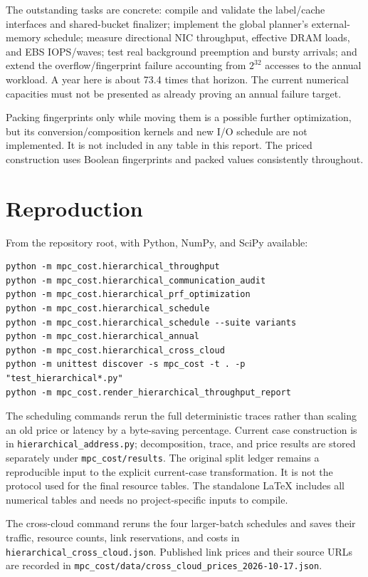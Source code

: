 \documentclass[11pt]{article}
\begin{document}
The outstanding tasks are concrete: compile and validate the label/cache
interfaces and shared-bucket finalizer; implement the global planner's
external-memory schedule; measure directional NIC throughput, effective
DRAM loads, and EBS IOPS/waves; test real background preemption and bursty
arrivals; and extend the overflow/fingerprint failure accounting from
$2^{32}$ accesses to the annual workload. A year here is about 73.4 times
that horizon. The current numerical capacities must not be presented as
already proving an annual failure target.

Packing fingerprints only while moving them is a possible further
optimization, but its conversion/composition kernels and new I/O schedule
are not implemented. It is not included in any table in this report.
The priced construction uses Boolean fingerprints and packed values
consistently throughout.

\appendix
\section{Reproduction}
From the repository root, with Python, NumPy, and SciPy available:
\begin{verbatim}
python -m mpc_cost.hierarchical_throughput
python -m mpc_cost.hierarchical_communication_audit
python -m mpc_cost.hierarchical_prf_optimization
python -m mpc_cost.hierarchical_schedule
python -m mpc_cost.hierarchical_schedule --suite variants
python -m mpc_cost.hierarchical_annual
python -m mpc_cost.hierarchical_cross_cloud
python -m unittest discover -s mpc_cost -t . -p "test_hierarchical*.py"
python -m mpc_cost.render_hierarchical_throughput_report
\end{verbatim}
The scheduling commands rerun the full deterministic traces rather than
scaling an old price or latency by a byte-saving percentage. Current
case construction is in \texttt{hierarchical\_address.py}; decomposition,
trace, and price results are stored separately under \texttt{mpc\_cost/results}.
The original split ledger remains a reproducible input to the explicit
current-case transformation. It is not the protocol used for the final
resource tables. The standalone LaTeX includes all numerical tables and
needs no project-specific inputs to compile.

The cross-cloud command reruns the four larger-batch schedules and saves
their traffic, resource counts, link reservations, and costs in
\texttt{hierarchical\_cross\_cloud.json}. Published link prices and their
source URLs are recorded in
\texttt{mpc\_cost/data/cross\_cloud\_prices\_2026-10-17.json}.
\end{document}
